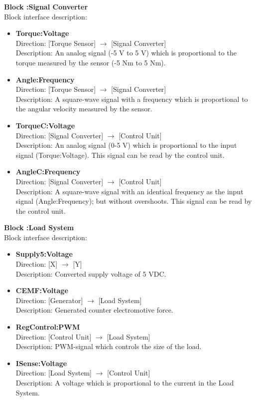 \textbf{Block :Signal Converter}\\
Block interface description:
\begin{itemize}
	\item \textbf{Torque:Voltage}\\
	Direction: [Torque Sensor] $\rightarrow$ [Signal Converter]\\
	Description: An analog signal (-5 V to 5 V) which is proportional to the torque measured by the sensor (-5 Nm to 5 Nm).
	\item \textbf{Angle:Frequency}\\
	Direction: [Torque Sensor] $\rightarrow$ [Signal Converter]\\
	Description: A square-wave signal with a frequency which is proportional to the angular velocity measured by the sensor.
	\item \textbf{TorqueC:Voltage}\\
	Direction: [Signal Converter] $\rightarrow$ [Control Unit]\\
	Description: An analog signal (0-5 V) which is proportional to the input signal (Torque:Voltage). This signal can be read by the control unit.
	\item \textbf{AngleC:Frequency}\\
	Direction: [Signal Converter] $\rightarrow$ [Control Unit]\\
	Description: A square-wave signal with an identical frequency as the input signal (Angle:Frequency); but without overshoots. This signal can be read by the control unit.
\end{itemize}

\textbf{Block :Load System}\\
Block interface description:
\begin{itemize}
	\item \textbf{Supply5:Voltage}\\
	Direction: [X] $\rightarrow$ [Y]\\
	Description: Converted supply voltage of 5 VDC.
	\item \textbf{CEMF:Voltage}\\
	Direction: [Generator] $\rightarrow$ [Load System]\\
	Description: Generated counter electromotive force.
	\item \textbf{RegControl:PWM}\\
	Direction: [Control Unit] $\rightarrow$ [Load System]\\
	Description: PWM-signal which controls the size of the load.
	\item \textbf{ISense:Voltage}\\
	Direction: [Load System] $\rightarrow$ [Control Unit]\\
	Description: A voltage which is proportional to the current in the Load System.
\end{itemize}

